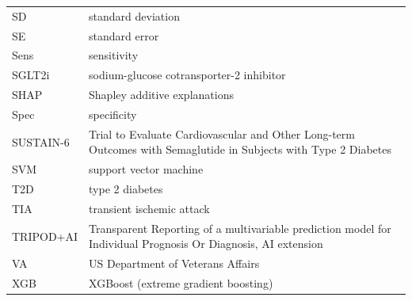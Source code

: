 \documentclass[journal]{IEEEtran}
\begin{document}
{\begin{longtable}[]{@{}
  >{\raggedright\arraybackslash}p{}
  >{\raggedright\arraybackslash}p{}@{}}
SD & standard deviation \\
SE & standard error \\
Sens & sensitivity \\
SGLT2i & sodium-glucose cotransporter-2 inhibitor \\
SHAP & Shapley additive explanations \\
Spec & specificity \\
SUSTAIN-6 & Trial to Evaluate Cardiovascular and Other Long-term
Outcomes with Semaglutide in Subjects with Type 2 Diabetes \\
SVM & support vector machine \\
T2D & type 2 diabetes \\
TIA & transient ischemic attack \\
TRIPOD+AI & Transparent Reporting of a multivariable prediction model
for Individual Prognosis Or Diagnosis, AI extension \\
VA & US Department of Veterans Affairs \\
XGB & XGBoost (extreme gradient boosting) \\
\end{longtable}
}
\end{document}
